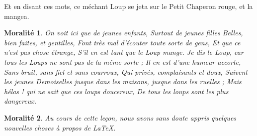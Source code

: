 \documentclass[a4paper,11pt]{article}
\begin{document}
\normalsize
\noindent
Et en disant ces mots, ce méchant Loup se jeta sur le Petit Chaperon rouge, et la mangea.

\newtheorem{morale}{Moralité}
\begin{morale}
On voit ici que de jeunes enfants, Surtout de jeunes filles Belles, bien faites, et gentilles, Font très mal d'écouter toute sorte de gens, Et que ce n'est pas chose étrange, S'il en est tant que le Loup mange.
Je dis le Loup, car tous les Loups ne sont pas de la même sorte ; Il en est d'une humeur accorte, Sans bruit, sans fiel et sans courroux, Qui privés, complaisants et doux, Suivent les jeunes Demoiselles jusque dans les maisons, jusque dans les ruelles ; Mais hélas ! qui ne sait que ces loups doucereux, De tous les loups sont les plus dangereux.
\end{morale}

\begin{morale}
Au cours de cette leçon, nous avons sans doute appris quelques nouvelles choses à propos de \LaTeX{}.
\end{morale}
\end{document}
